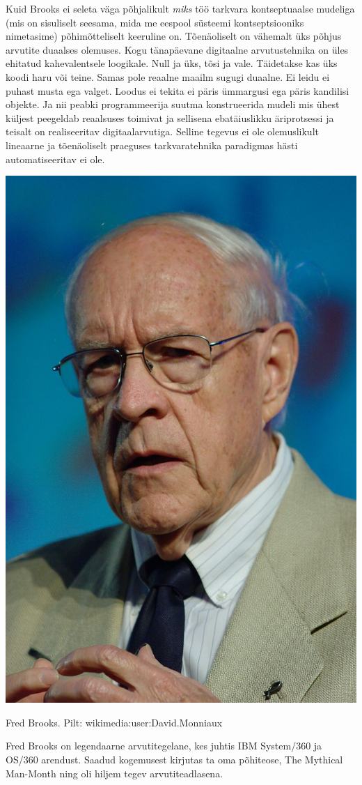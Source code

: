 Kuid Brooks ei seleta väga põhjalikult \emph{miks} töö tarkvara kontseptuaalse mudeliga (mis on sisuliselt seesama, mida me eespool süsteemi kontseptsiooniks nimetasime) põhimõtteliselt keeruline on. Tõenäoliselt on vähemalt üks põhjus arvutite duaalses olemuses. Kogu tänapäevane digitaalne arvutustehnika on üles ehitatud kahevalentsele loogikale. Null ja üks, tõsi ja vale. Täidetakse kas üks koodi haru või teine. Samas pole reaalne maailm sugugi duaalne. Ei leidu ei puhast musta ega valget. Loodus ei tekita ei päris ümmargusi ega päris kandilisi objekte. Ja nii peabki programmeerija suutma konstrueerida mudeli mis ühest küljest peegeldab reaalsuses toimivat ja sellisena ebatäiuslikku äriprotsessi ja teisalt on realiseeritav digitaalarvutiga. Selline tegevus ei ole olemuslikult lineaarne ja tõenäoliselt praeguses tarkvaratehnika paradigmas hästi automatiseeritav ei ole. 

\begin{marginfigure}
		\begin{center}
		\includegraphics[width=.7\linewidth]{682px-Frederick_Brooks_IMG_2279.jpg}
		\caption{Fred Brooks. Pilt: wikimedia:user:David.Monniaux}
		\label{fig:brooks}
		\end{center}
		Fred Brooks on legendaarne arvutitegelane, kes juhtis IBM System/360 ja OS/360 arendust. Saadud kogemusest kirjutas ta oma põhiteose, The Mythical Man-Month ning oli hiljem tegev arvutiteadlasena. 
\end{marginfigure}

